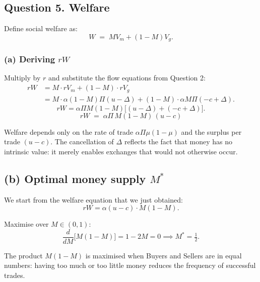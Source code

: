 \documentclass[11pt, a4paper]{article}
\begin{document}
\subsection*{Question 5. Welfare}

Define social welfare as:
\[
  W \;=\;  M V_m + (1- M)V_g.
\]

\subsubsection*{(a) Deriving $rW$}

Multiply by $r$ and substitute the flow equations from Question 2:
\begin{align*}
  rW &=  M\cdot rV_m + (1- M)\cdot rV_g \\
     &=  M\cdot\alpha(1- M)\Pi(u-\Delta)
        + (1- M)\cdot\alpha M\Pi(-c+\Delta).
\end{align*}
\[
  rW = \alpha\Pi M(1- M)\bigl[(u-\Delta) + (-c+\Delta)\bigr].
\]
\[
rW \;=\; \alpha\Pi\, M(1- M)\,(u-c)
\]

Welfare depends only on the rate of trade $\alpha\Pi\mu(1-\mu)$ and the
surplus per trade $(u-c)$. The cancellation of $\Delta$ reflects the fact that money has no intrinsic value: it merely enables exchanges that would not otherwise occur.



\subsection*{(b) Optimal money supply $ M^*$}

We start from the welfare equation that we just obtained:
\[
  rW = \alpha(u-c)\cdot M(1- M).
\]

Maximise over $ M \in (0,1)$:
\[
  \frac{d}{d M}\bigl[ M(1- M)\bigr]
  = 1 - 2 M = 0
  \implies
   M^* = \tfrac{1}{2}.
\]

The product $M(1-M)$ is maximised when Buyers and Sellers are in equal numbers: having too much or too little money reduces the frequency of successful trades.


\end{document}
